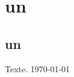 \documentclass[%
]{EcoleLecture}
\begin{document}
\maketitle

\section{un}
\lipsum[1]

\subsection{un}
\lipsum[1]


Texte. \today{} \thistime
\begin{colonnes}
\lipsum
\end{colonnes}
\end{document}
